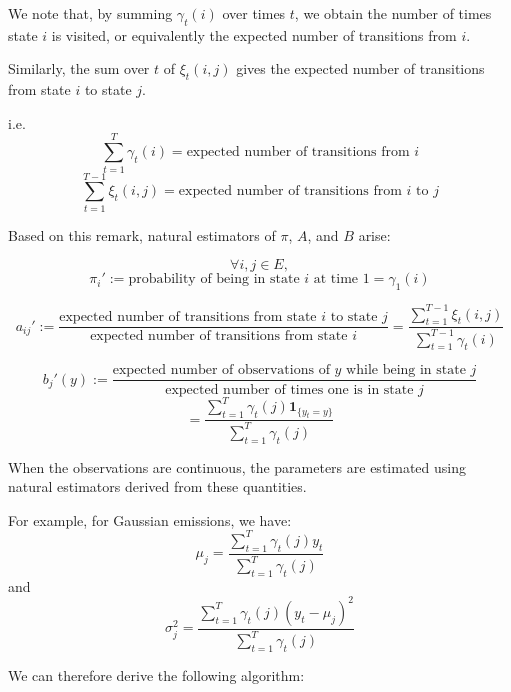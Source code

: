 \documentclass[11pt]{article}
\begin{document}
We note that, by summing $\gamma_t(i)$ over times $t$, we obtain the number of times state $i$ is visited, or equivalently the expected number of transitions from $i$.

Similarly, the sum over $t$ of $\xi_t(i,j)$ gives the expected number of transitions from state $i$ to state $j$.

i.e.
\[
\sum_{t=1}^{T}\gamma_t(i) = \text{expected number of transitions from } i
\]
\[
\sum_{t=1}^{T-1}\xi_t(i,j) = \text{expected number of transitions from } i \text{ to } j
\]

Based on this remark, natural estimators of $\pi$, $A$, and $B$ arise:

\[
\forall i,j \in E,
\]
\[
\pi_i' := \text{probability of being in state } i \text{ at time } 1
=\gamma_1(i)
\]

\[
a_{ij}' :=
\frac{\text{expected number of transitions from state } i \text{ to state } j}
{\text{expected number of transitions from state } i}
=
\frac{\sum_{t=1}^{T-1}\xi_t(i,j)}
{\sum_{t=1}^{T-1}\gamma_t(i)}
\]

\[
b_j'(y) :=
\frac{\text{expected number of observations of } y \text{ while being in state } j}
{\text{expected number of times one is in state } j}
\]
\[
=
\frac{\sum_{t=1}^{T}\gamma_t(j)\mathbf{1}_{\{y_t=y\}}}
{\sum_{t=1}^{T}\gamma_t(j)}
\]

When the observations are continuous, the parameters are estimated using natural estimators derived from these quantities.

For example, for Gaussian emissions, we have:
\[
\mu_j =
\frac{\sum_{t=1}^{T}\gamma_t(j)y_t}
{\sum_{t=1}^{T}\gamma_t(j)}
\]
and
\[
\sigma_j^2 =
\frac{\sum_{t=1}^{T}\gamma_t(j)(y_t-\mu_j)^2}
{\sum_{t=1}^{T}\gamma_t(j)}
\]

We can therefore derive the following algorithm:

\vspace{0.5cm}
\end{document}
